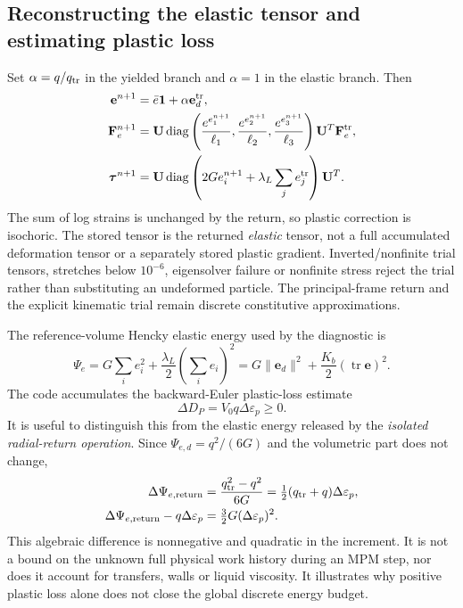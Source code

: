 \subsection{Reconstructing the elastic tensor and estimating plastic loss}
Set $\alpha=q/q_{\rm tr}$ in the yielded branch and $\alpha=1$ in the elastic
branch. Then
\begin{align}
 \mathbf e^{n+1}&=\bar e\mathbf1+\alpha\mathbf e_d^{\rm tr},\\
 \mathbf F_e^{n+1}&=\mathbf U\operatorname{diag}
       \left(\frac{e^{e_1^{n+1}}}{\ell_1},
             \frac{e^{e_2^{n+1}}}{\ell_2},
             \frac{e^{e_3^{n+1}}}{\ell_3}\right)\mathbf U^T\mathbf F_e^{\rm tr},
 \label{eq:hencky-reconstruction}\\
 \boldsymbol\tau^{n+1}&=\mathbf U\operatorname{diag}
       \left(2G e_i^{n+1}+\lambda_L\sum_j e_j^{\rm tr}\right)\mathbf U^T.
\end{align}
The sum of log strains is unchanged by the return, so plastic correction is
isochoric. The stored tensor is the returned \emph{elastic} tensor, not a full
accumulated deformation tensor or a separately stored plastic gradient.
Inverted/nonfinite trial tensors, stretches below $10^{-6}$, eigensolver failure
or nonfinite stress reject the trial rather than substituting an undeformed
particle. The principal-frame return and the explicit kinematic trial remain
discrete constitutive approximations.

The reference-volume Hencky elastic energy used by the diagnostic is
\begin{equation}
 \Psi_e=G\sum_i e_i^2+\frac{\lambda_L}{2}\left(\sum_i e_i\right)^2
       =G\|\mathbf e_d\|^2+\frac{K_b}{2}(\operatorname{tr}\mathbf e)^2.
\end{equation}
The code accumulates the backward-Euler plastic-loss estimate
\begin{equation}
 \Delta D_P=V_0 q\Delta\varepsilon_p\geq0. \label{eq:plastic-loss}
\end{equation}
It is useful to distinguish this from the elastic energy released by the
\emph{isolated radial-return operation}. Since $\Psi_{e,d}=q^2/(6G)$ and the
volumetric part does not change,
\begin{align}
 \Delta\Psi_{e,\rm return}
 &=\frac{q_{\rm tr}^2-q^2}{6G}
   =\tfrac12(q_{\rm tr}+q)\Delta\varepsilon_p,\\
 \Delta\Psi_{e,\rm return}-q\Delta\varepsilon_p
 &=\tfrac32G(\Delta\varepsilon_p)^2. \label{eq:return-energy-gap}
\end{align}
This algebraic difference is nonnegative and quadratic in the increment. It is
not a bound on the unknown full physical work history during an MPM step, nor
does it account for transfers, walls or liquid viscosity. It illustrates why
positive plastic loss alone does not close the global discrete energy budget.

